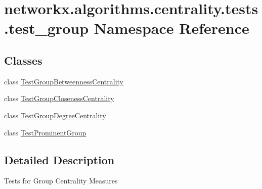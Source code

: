 \hypertarget{namespacenetworkx_1_1algorithms_1_1centrality_1_1tests_1_1test__group}{}\section{networkx.\+algorithms.\+centrality.\+tests.\+test\+\_\+group Namespace Reference}
\label{namespacenetworkx_1_1algorithms_1_1centrality_1_1tests_1_1test__group}
\subsection*{Classes}
\begin{DoxyCompactItemize}
\item 
class \hyperlink{classnetworkx_1_1algorithms_1_1centrality_1_1tests_1_1test__group_1_1TestGroupBetweennessCentrality}{Test\+Group\+Betweenness\+Centrality}
\item 
class \hyperlink{classnetworkx_1_1algorithms_1_1centrality_1_1tests_1_1test__group_1_1TestGroupClosenessCentrality}{Test\+Group\+Closeness\+Centrality}
\item 
class \hyperlink{classnetworkx_1_1algorithms_1_1centrality_1_1tests_1_1test__group_1_1TestGroupDegreeCentrality}{Test\+Group\+Degree\+Centrality}
\item 
class \hyperlink{classnetworkx_1_1algorithms_1_1centrality_1_1tests_1_1test__group_1_1TestProminentGroup}{Test\+Prominent\+Group}
\end{DoxyCompactItemize}


\subsection{Detailed Description}
\begin{DoxyVerb}Tests for Group Centrality Measures
\end{DoxyVerb}
 